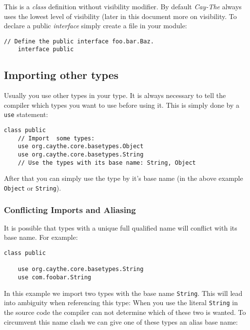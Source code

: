 \documentclass[11pt,a4paper]{report}
\begin{document}
This is a \textit{class} definition without visibility modifier. By default \textit{Cay-The} always uses the lowest level of visibility (later in this document more on visibility. To declare a public \textit{interface} simply create a file in your module:

\begin{lstlisting}[language=CayThe, title=foo/bar/Baz.ct]
    // Define the public interface foo.bar.Baz.
    interface public
\end{lstlisting}

\subsection{Importing other types}

Usually you use other types in your type. It is always necessary to tell the compiler which types you want to use before using it. This is simply done by a \texttt{use} statement:

\begin{lstlisting}[language=CayThe, title=foo/bar/Baz.ct]
    class public
    // Import  some types:
    use org.caythe.core.basetypes.Object
    use org.caythe.core.basetypes.String
    // Use the types with its base name: String, Object
\end{lstlisting}

After that you can simply use the type by it's base name (in the above example \texttt{Object} or \texttt{String}).

\subsubsection{Conflicting Imports and Aliasing}

It is possible that types with a unique full qualified name will conflict with its base name. For example:

\begin{lstlisting}[language=CayThe, title=foo/bar/Baz.ct]
    class public
    
    use org.caythe.core.basetypes.String
    use com.foobar.String
\end{lstlisting}

In this example we import two types with the base name \texttt{String}. This will lead into ambiguity when referencing this type: When you use the literal \texttt{String} in the source code the compiler can not determine which of these two is wanted. To circumvent this name clash we can give one of these types an alias base name:
\end{document}
